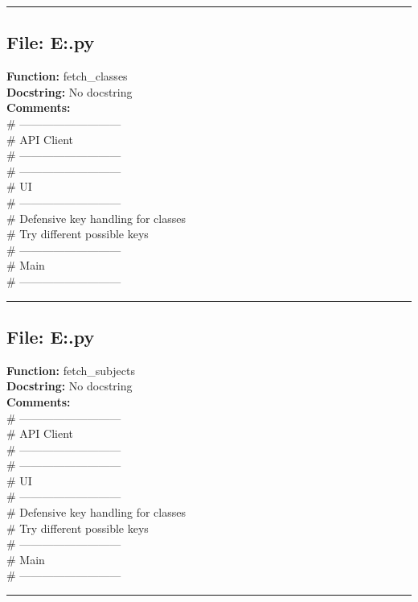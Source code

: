 {\hrule

\subsection*{File: E:\project\capstone\frontend\faculty\attendence.py}
\textbf{Function:} fetch_classes\\
\textbf{Docstring:} No docstring\\
\textbf{Comments:}\\
# ---------------------------\\
# API Client\\
# ---------------------------\\
# ---------------------------\\
# UI\\
# ---------------------------\\
# Defensive key handling for classes\\
# Try different possible keys\\
# ---------------------------\\
# Main\\
# ---------------------------\\

\hrule

\subsection*{File: E:\project\capstone\frontend\faculty\attendence.py}
\textbf{Function:} fetch_subjects\\
\textbf{Docstring:} No docstring\\
\textbf{Comments:}\\
# ---------------------------\\
# API Client\\
# ---------------------------\\
# ---------------------------\\
# UI\\
# ---------------------------\\
# Defensive key handling for classes\\
# Try different possible keys\\
# ---------------------------\\
# Main\\
# ---------------------------\\

\hrule

}
